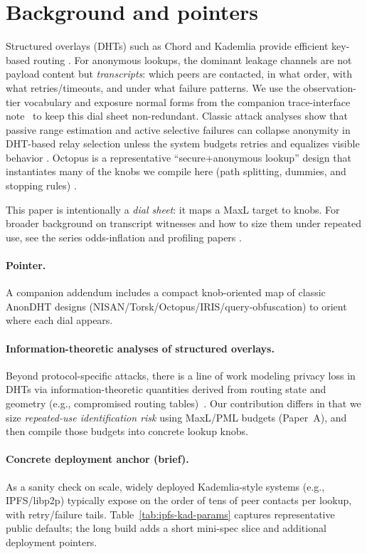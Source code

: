 \documentclass[11pt]{article}
\begin{document}
\section{Background and pointers}\label{sec:background}
Structured overlays (DHTs) such as Chord and Kademlia provide efficient key-based routing \cite{stoica2001chord,maymounkov2002kademlia}.
For anonymous lookups, the dominant leakage channels are not payload content but \emph{transcripts}: which peers are contacted, in what order, with what retries/timeouts, and under what failure patterns. We use the observation-tier vocabulary and exposure normal forms from the companion trace-interface note~\cite{series:traceifaces} to keep this dial sheet non-redundant.
Classic attack analyses show that passive range estimation and active selective failures can collapse anonymity in DHT-based relay selection unless the system budgets retries and equalizes visible behavior \cite{wang2010lookup}.
Octopus is a representative ``secure+anonymous lookup'' design that instantiates many of the knobs we compile here (path splitting, dummies, and stopping rules) \cite{wang2012octopus}.

This paper is intentionally a \emph{dial sheet}: it maps a MaxL target to knobs.
For broader background on transcript witnesses and how to size them under repeated use, see the series odds-inflation and profiling papers \cite{series:oddsinflation,series:profiling}.
\paragraph{Pointer.} A companion addendum includes a compact knob-oriented map of classic AnonDHT designs (NISAN/Torsk/Octopus/IRIS/query-obfuscation) to orient where each dial appears.
\cite{series:bossfightBaddendum}




\paragraph{Information-theoretic analyses of structured overlays.}
Beyond protocol-specific attacks, there is a line of work modeling privacy loss in DHTs via information-theoretic quantities derived from routing state and geometry (e.g., compromised routing tables)~\cite{ray2007framework}.
Our contribution differs in that we size \emph{repeated-use identification risk} using MaxL/PML budgets (Paper~A), and then compile those budgets into concrete lookup knobs.

\paragraph{Concrete deployment anchor (brief).}
As a sanity check on scale, widely deployed Kademlia-style systems (e.g., IPFS/libp2p) typically expose on the order of tens of peer contacts per lookup, with retry/failure tails.
Table~\ref{tab:ipfs-kad-params} captures representative public defaults; the long build adds a short mini-spec slice and additional deployment pointers.
\end{document}
